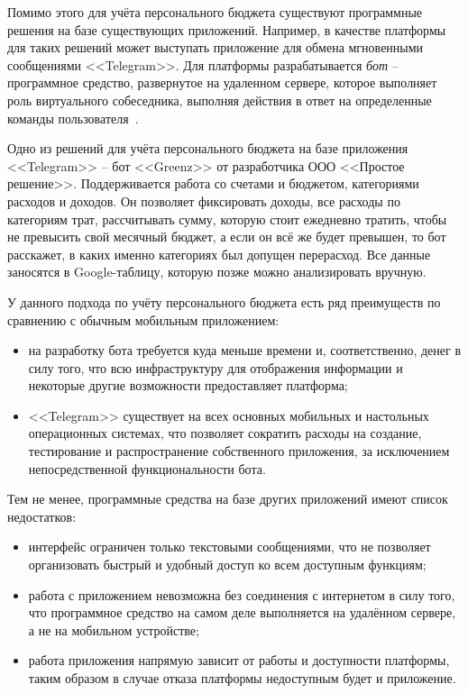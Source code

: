 Помимо этого для учёта персонального бюджета существуют программные решения на базе существующих приложений.
Например, в качестве платформы для таких решений может выступать приложение для обмена мгновенными сообщениями <<Telegram>>.
Для платформы разрабатывается \emph{бот} -- программное средство, развернутое на удаленном сервере, которое выполняет роль виртуального собеседника, выполняя действия в ответ на определенные команды пользователя~\cite{telegram_bots}.

Одно из решений для учёта персонального бюджета на базе приложения <<Telegram>> -- бот <<Greenz>> от разработчика ООО <<Простое решение>>.
Поддерживается работа со счетами и бюджетом, категориями расходов и доходов.
Он позволяет фиксировать доходы, все расходы по категориям трат, рассчитывать сумму, которую стоит ежедневно тратить, чтобы не превысить свой месячный бюджет, а если он всё же будет превышен, то бот расскажет, в каких именно категориях был допущен перерасход.
Все данные заносятся в Google-таблицу, которую позже можно анализировать вручную.

У данного подхода по учёту персонального бюджета есть ряд преимуществ по сравнению с обычным мобильным приложением:
\begin{itemize}
    \item на разработку бота требуется куда меньше времени и, соответственно, денег в силу того, что всю инфраструктуру для отображения информации и некоторые другие возможности предоставляет платформа;
    \item <<Telegram>> существует на всех основных мобильных и настольных операционных системах, что позволяет сократить расходы на создание, тестирование и распространение собственного приложения, за исключением непосредственной функциональности бота.
\end{itemize}

Тем не менее, программные средства на базе других приложений имеют список недостатков:
\begin{itemize}
    \item интерфейс ограничен только текстовыми сообщениями, что не позволяет организовать быстрый и удобный доступ ко всем доступным функциям;
    \item работа с приложением невозможна без соединения с интернетом в силу того, что программное средство на самом деле выполняется на удалённом сервере, а не на мобильном устройстве;
    \item работа приложения напрямую зависит от работы и доступности платформы, таким образом в случае отказа платформы недоступным будет и приложение.
\end{itemize}

